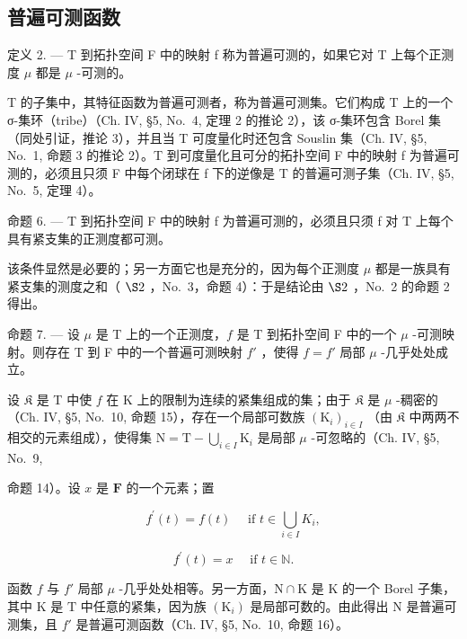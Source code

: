 \subsection{普遍可测函数}

定义 2. --- T 到拓扑空间 F 中的映射 f 称为普遍可测的，如果它对 T 上每个正测度 \(\mu\) 都是 \(\mu\) -可测的。

T 的子集中，其特征函数为普遍可测者，称为普遍可测集。它们构成 T 上的一个 σ-集环（tribe）（Ch. IV, §5, No.~4, 定理 2 的推论 2），该 σ-集环包含 Borel 集（同处引证，推论 3），并且当 T 可度量化时还包含 Souslin 集（Ch. IV, §5, No.~1, 命题 3 的推论 2）。T 到可度量化且可分的拓扑空间 F 中的映射 f 为普遍可测的，必须且只须 F 中每个闭球在 f 下的逆像是 T 的普遍可测子集（Ch. IV, §5, No.~5, 定理 4）。

命题 6. --- T 到拓扑空间 F 中的映射 f 为普遍可测的，必须且只须 f 对 T 上每个具有紧支集的正测度都可测。

该条件显然是必要的；另一方面它也是充分的，因为每个正测度 \(\mu\) 都是一族具有紧支集的测度之和（ \(\S2\) ，No.~3，命题 4）：于是结论由 \(\S2\) ，No.~2 的命题 2 得出。

命题 7. --- 设 \(\mu\) 是 T 上的一个正测度，\(f\) 是 T 到拓扑空间 F 中的一个 \(\mu\) -可测映射。则存在 T 到 F 中的一个普遍可测映射 \(f'\) ，使得 \(f = f'\) 局部 \(\mu\) -几乎处处成立。

设 \(\mathfrak{K}\) 是 T 中使 \(f\) 在 K 上的限制为连续的紧集组成的集；由于 \(\mathfrak{K}\) 是 \(\mu\) -稠密的（Ch. IV, §5, No.~10, 命题 15），存在一个局部可数族 \((\mathrm{K}_i)_{i\in I}\) （由 \(\mathfrak{K}\) 中两两不相交的元素组成），使得集 \(\mathrm{N} = \mathrm{T} - \bigcup_{i\in I}\mathrm{K}_i\) 是局部 \(\mu\) -可忽略的（Ch. IV, §5, No.~9,

命题 14）。设 \(x\) 是 \(\mathbf{F}\) 的一个元素；置

\[
f ^ {\prime} (t) = f (t) \quad \text { if } t \in \bigcup_ {i \in I} K _ {i},
\]

\[
f ^ {\prime} (t) = x \quad \text { if } t \in \mathbb {N}.
\]

函数 \(f\) 与 \(f'\) 局部 \(\mu\) -几乎处处相等。另一方面，\(\mathrm{N} \cap \mathrm{K}\) 是 \(\mathrm{K}\) 的一个 Borel 子集，其中 \(\mathrm{K}\) 是 \(\mathrm{T}\) 中任意的紧集，因为族 \((\mathrm{K}_i)\) 是局部可数的。由此得出 \(\mathrm{N}\) 是普遍可测集，且 \(f'\) 是普遍可测函数（Ch. IV, §5, No.~10, 命题 16）。

